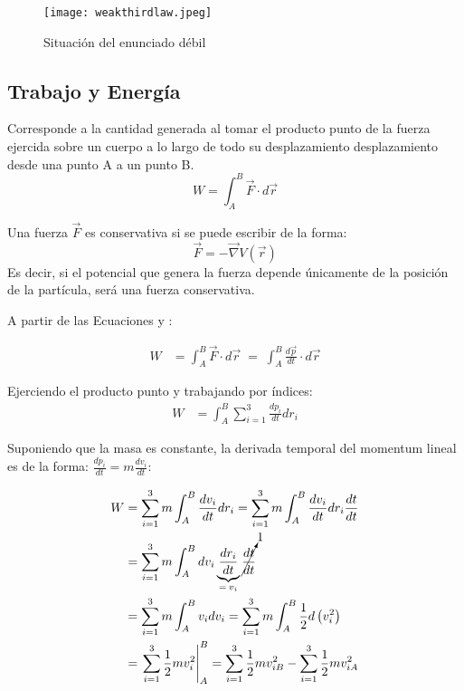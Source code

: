 \documentclass[/home/hernan/Documentos/Apuntes_mecanica_teorica/main.tex]{subfiles}
\begin{document}
	\begin{marginfigure}
		\begin{figure}[H]
			\centering
			\texttt{[image: weakthirdlaw.jpeg]}
			\caption{Situación del enunciado débil}
			\label{fig: Nthirdweak}
		\end{figure}
	\end{marginfigure}

	\subsection{Trabajo y Energía}

	\begin{definition} Corresponde a la cantidad generada al tomar el producto punto de la fuerza ejercida sobre un cuerpo a lo largo de todo su desplazamiento desplazamiento desde una punto A a un punto B.
		\begin{equation}
			W = \int_{A}^{B} \vec{F} \cdot d\vec{r}
			\label{eq: work}
		\end{equation}
	\end{definition}

	\begin{definition} Una fuerza $\vec{F}$ es conservativa si se puede escribir de la forma:
		\begin{equation}
			\vec{F} = - \vec{\nabla} V \left(\vec{r}\right)
			\label{eq: conservativeforce}
		\end{equation}
		Es decir, si el potencial que genera la fuerza depende únicamente de la posición de la partícula, será una fuerza conservativa.
	\end{definition}

	A partir de las Ecuaciones  y :

	\begin{align*}
		W & = \int_{A}^{B} \vec{F} \cdot d\vec{r} \; = \; \int_{A}^{B}  \frac{d \vec{p}}{dt} \cdot d\vec{r}
	\end{align*}

	Ejerciendo el producto punto y trabajando por índices:
	\begin{align*}
		W & = \int_{A}^{B} \sum_{i=1}^{3} \frac{d p_{i}}{dt}dr_{i}
	\end{align*}

	Suponiendo que la masa es constante, la derivada temporal del momentum lineal es de la forma: $\frac{d p_{i}}{dt} = m \frac{d v_{i}}{dt}$:

	\begin{align*}
		W & =  \sum_{i=1}^{3} m \int_{A}^{B} \frac{d v_{i}}{dt}dr_{i} =  \sum_{i=1}^{3} m \int_{A}^{B} \frac{d v_{i}}{dt}dr_{i} \frac{dt}{dt}\\ 
		& = \sum_{i=1}^{3} m \int_{A}^{B} d v_{i} \underbrace{\frac{d r_{i}}{dt}}_{= \: v_{i}} \cancelto{1}{\frac{dt}{dt}}\\
		& = \sum_{i=1}^{3} m \int_{A}^{B}  v_{i} d v_{i} =  \sum_{i=1}^{3} m \int_{A}^{B} \frac{1}{2} d \left(v_{i}^{2}\right)\\
		& = \left . \sum_{i=1}^{3} \frac{1}{2} m v_{i}^{2} \right|_{A} ^{B} = \sum_{i=1}^{3} \frac{1}{2} m v_{iB}^{2} - \sum_{i=1}^{3} \frac{1}{2} m v_{iA}^{2}
	\end{align*}
\end{document}
